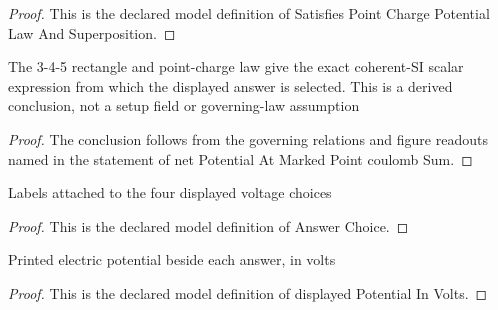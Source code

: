 \begin{proof}
  This is the declared model definition of Satisfies Point Charge Potential Law And Superposition.
\end{proof}
\begin{lemma}
  \label{lem:physics:phyx-mini-0858:phyxminiproblems-problemphyxmini0858-netpotentialatmarkedpoint-coulombsum}
  The 3-4-5 rectangle and point-charge law give the exact coherent-SI scalar expression from which the displayed answer is selected. This is a derived conclusion, not a setup field or governing-law assumption
\end{lemma}
\begin{proof}
  The conclusion follows from the governing relations and figure readouts named in the statement of net Potential At Marked Point coulomb Sum.
\end{proof}
\begin{definition}
  \label{def:physics:phyx-mini-0858:phyxminiproblems-problemphyxmini0858-answerchoice}
  Labels attached to the four displayed voltage choices
\end{definition}
\begin{proof}
  This is the declared model definition of Answer Choice.
\end{proof}
\begin{definition}
  \label{def:physics:phyx-mini-0858:phyxminiproblems-problemphyxmini0858-displayedpotentialinvolts}
  Printed electric potential beside each answer, in volts
\end{definition}
\begin{proof}
  This is the declared model definition of displayed Potential In Volts.
\end{proof}
